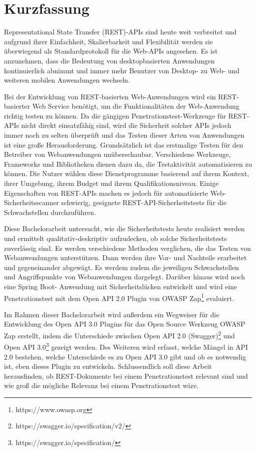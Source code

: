 \chapter{\textbf{Kurzfassung}}

Representational State Transfer (REST)-APIs sind heute weit verbreitet und aufgrund ihrer Einfachheit, Skalierbarkeit und Flexibilität werden sie überwiegend als Standardprotokoll für die Web-APIs angesehen. Es ist anzunehmen, dass die Bedeutung von desktopbasierten Anwendungen kontinuierlich abnimmt und immer mehr Benutzer von Desktop- zu Web- und weiteren mobilen Anwendungen wechseln.

Bei der Entwicklung von REST-basierten Web-Anwendungen wird ein REST-basierter Web Service benötigt, um die Funktionalitäten der Web-Anwendung richtig testen zu können. Da die gängigen Penetrationstest-Werkzeuge für REST-APIs nicht direkt einsatzfähig sind, wird die Sicherheit solcher APIs jedoch immer noch zu selten überprüft und das Testen dieser Arten von Anwendungen ist eine große Herausforderung. Grundsätzlich ist das erstmalige Testen für den Betreiber von Webanwendungen unüberschaubar. Verschiedene Werkzeuge, Frameworks und Bibliotheken dienen dazu da, die Testaktivität automatisieren zu können. Die Nutzer wählen diese Dienstprogramme basierend auf ihrem Kontext, ihrer Umgebung, ihrem Budget und ihrem Qualifikationsniveau. Einige Eigenschaften von REST-APIs machen es jedoch für automatisierte Web-Sicherheitsscanner schwierig, geeignete REST-API-Sicherheitstests für die Schwachstellen durchzuführen.

Diese Bachelorarbeit untersucht, wie die Sicherheitstests heute realisiert werden und ermittelt qualitativ-deskriptiv aufzudecken, ob solche Sicherheitstests zuverlässig sind. Es werden verschiedene Methoden verglichen, die das Testen von Webanwendungen unterstützen. Dann werden ihre Vor- und Nachteile erarbeitet und gegeneinander abgewägt. Es werdem zudem die jeweiligen Schwachstellen und Angriffspunkte von Webanwendungen dargelegt. Darüber hinaus wird noch eine Spring Boot- Anwendung mit Sicherheitslücken entwickelt und wird eine Penetrationstest mit dem Open API 2.0 Plugin von OWASP Zap\footnote{https://www.owasp.org} evaluiert.

Im Rahmen dieser Bachelorarbeit wird außerdem ein Wegweiser für die Entwicklung des Open API 3.0 Plugins für das Open Source Werkzeug OWASP Zap erstellt, indem die Unterschiede zwischen Open API 2.0 (Swagger)\footnote{https://swagger.io/specification/v2/} und Open API 3.0\footnote{https://swagger.io/specification/} gezeigt werden. Des Weiteren wird erfasst, welche Mängel in API 2.0 bestehen, welche Unterschiede es zu Open API 3.0 gibt und ob es notwendig ist, eben dieses Plugin zu entwickeln. Schlussendlich soll diese Arbeit herausfinden, ob REST-Dokumente bei einem Penetrationstest relevant sind und wie groß die mögliche Relevanz bei einem Penetrationstest wäre.
